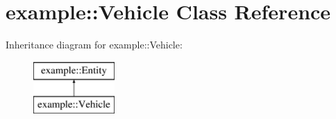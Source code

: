 \hypertarget{classexample_1_1_vehicle}{}\section{example\+::Vehicle Class Reference}
\label{classexample_1_1_vehicle}
Inheritance diagram for example\+::Vehicle\+:\begin{figure}[H]
\begin{center}
\leavevmode
\includegraphics[height=2.000000cm]{classexample_1_1_vehicle}
\end{center}
\end{figure}
